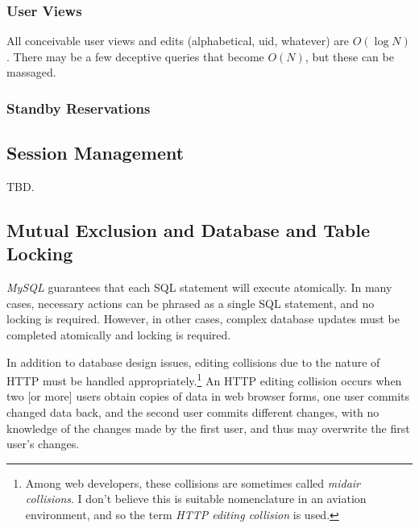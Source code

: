 \documentclass[letterpaper,10pt,titlepage]{article}
\begin{document}

\subsubsection{User Views}
\label{stdd0:sqcx0:suvw0}

All conceivable user views and edits (alphabetical, uid, whatever) are
$O(\log N)$.  There may be a few deceptive queries that become $O(N)$, but these
can be massaged.


\subsubsection{Standby Reservations}
\label{stdd0:sqcx0:ssby0}





\subsection{Session Management}
\label{stdd0:ssmg0}

TBD.


\subsection{Mutual Exclusion and Database and Table Locking}
\label{stdd0:sdbl0}

\emph{MySQL} guarantees that
each SQL statement will execute atomically.  In many cases, necessary actions
can be phrased as a single SQL statement, and no locking is required.  However, in
other cases, complex database updates must be completed atomically and locking
is required.

In addition to database design issues, editing collisions due to the nature
of HTTP must be handled appropriately.\footnote{Among web developers, these collisions
are sometimes called \emph{midair collisions}\@.  I don't believe
this is suitable nomenclature in an aviation environment, and so the
term \emph{HTTP editing collision} is used.}
An HTTP editing collision occurs when two [or more] users obtain copies of data
in web browser forms, one user commits changed data back, and the second user
commits different changes, with no knowledge of the changes made by the first user,
and thus may overwrite the first user's changes.
\end{document}
